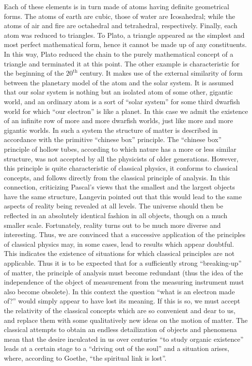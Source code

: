 \documentclass[a4paper,sfsidenotes,colorlinks=true]{tufte-book}
\numberwithin{equation}{section}
\numberwithin{figure}{section}
\begin{document}
Each of these elements is in turn made of atoms having definite geometrical forms. The atoms of earth are cubic, those of water are Icosahedral; while the atoms of air and fire are octahedral and tetrahedral, respectively. Finally, each atom was reduced to triangles. To Plato, a triangle appeared as the simplest and most perfect mathematical form, hence it cannot be made up of any constituents. In this way, Plato reduced the chain to the purely mathematical concept of a triangle and terminated it at this point.
The other example is characteristic for the beginning of the
$20^{\text{th}}$ century. It makes use of the external similarity of
form between the planetary model of the atom and the solar system. It
is assumed that our solar system is nothing but an isolated atom of
some other, gigantic world, and an ordinary atom is a sort of ``solar
system'' for some third dwarfish world for which ``our electron'' is
like a planet. In this case we admit the existence of an infinite row
of more and more dwarfish worlds, just like more and more gigantic
worlds. In such a system the structure of matter is described in
accordance with the primitive ``chinese box'' principle. The ``chinese
box'' principle of hollow tubes, according to which nature has a more
or less similar structure, was not accepted by all the physicists of
older generations. However, this principle is quite characteristic of
classical physics, it conforms to classical concepts, and follows
directly from the classical principle of analysis. In this connection,
criticizing Pascal's views that the smallest and the largest objects
have the same structure, Langevin \cite{langevin-1934} pointed out that this would lead to the same aspects of reality being revealed at all levels. The universe should then be reflected in an absolutely identical fashion in all objects, though on a much smaller scale. Fortunately, reality turns out to be much more diverse and interesting. Thus, we are convinced that a successive application of the principles of classical physics may, in some cases, lead to results which appear doubtful. This indicates the existence of situations for which classical principles are not applicable. Thus it is to be expected that for a sufficiently strong ``breaking-up'' of matter, the principle of analysis must become redundant (thus the idea of the independence of the object of measurement from the measuring instrument must also become obsolete). In this context the question ``what is an electron made of?'' would simply appear to have lost its meaning. If this is so, we must accept the relativity of the classical concepts which are so convenient and dear to us, and replace them with some qualitatively new ideas on the motion of matter. The classical attempts to obtain an endless detailization of objects and phenomena mean that the desire inculcated in us over centuries ``to study organic existence'' leads at a certain stage to a ``driving out of the soul'' and a situation arises, where, according to Goethe, ``the spiritual link is lost''.
\end{document}
